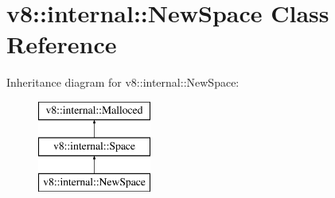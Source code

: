 \hypertarget{classv8_1_1internal_1_1_new_space}{}\section{v8\+:\+:internal\+:\+:New\+Space Class Reference}
\label{classv8_1_1internal_1_1_new_space}
Inheritance diagram for v8\+:\+:internal\+:\+:New\+Space\+:\begin{figure}[H]
\begin{center}
\leavevmode
\includegraphics[height=3.000000cm]{classv8_1_1internal_1_1_new_space}
\end{center}
\end{figure}
